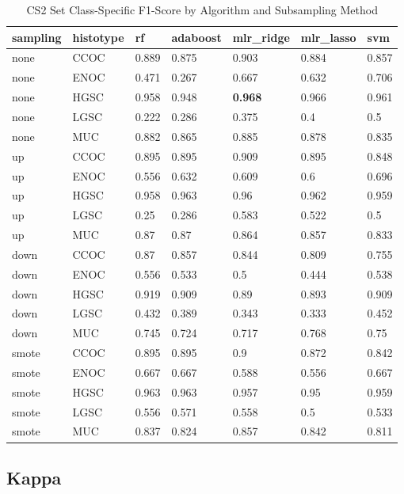 \documentclass[
]{report}
\begin{document}
\begin{table}

\caption{\label{tab:cs2-f1-class-table}CS2 Set Class-Specific F1-Score by Algorithm and Subsampling Method}
\centering
\begin{tabular}[t]{l|l|l|l|l|l|l}
\hline
sampling & histotype & rf & adaboost & mlr\_ridge & mlr\_lasso & svm\\
\hline
none & CCOC & 0.889 & 0.875 & 0.903 & 0.884 & 0.857\\
\hline
none & ENOC & 0.471 & 0.267 & 0.667 & 0.632 & 0.706\\
\hline
none & HGSC & 0.958 & 0.948 & \textbf{0.968} & 0.966 & 0.961\\
\hline
none & LGSC & 0.222 & 0.286 & 0.375 & 0.4 & 0.5\\
\hline
none & MUC & 0.882 & 0.865 & 0.885 & 0.878 & 0.835\\
\hline
up & CCOC & 0.895 & 0.895 & 0.909 & 0.895 & 0.848\\
\hline
up & ENOC & 0.556 & 0.632 & 0.609 & 0.6 & 0.696\\
\hline
up & HGSC & 0.958 & 0.963 & 0.96 & 0.962 & 0.959\\
\hline
up & LGSC & 0.25 & 0.286 & 0.583 & 0.522 & 0.5\\
\hline
up & MUC & 0.87 & 0.87 & 0.864 & 0.857 & 0.833\\
\hline
down & CCOC & 0.87 & 0.857 & 0.844 & 0.809 & 0.755\\
\hline
down & ENOC & 0.556 & 0.533 & 0.5 & 0.444 & 0.538\\
\hline
down & HGSC & 0.919 & 0.909 & 0.89 & 0.893 & 0.909\\
\hline
down & LGSC & 0.432 & 0.389 & 0.343 & 0.333 & 0.452\\
\hline
down & MUC & 0.745 & 0.724 & 0.717 & 0.768 & 0.75\\
\hline
smote & CCOC & 0.895 & 0.895 & 0.9 & 0.872 & 0.842\\
\hline
smote & ENOC & 0.667 & 0.667 & 0.588 & 0.556 & 0.667\\
\hline
smote & HGSC & 0.963 & 0.963 & 0.957 & 0.95 & 0.959\\
\hline
smote & LGSC & 0.556 & 0.571 & 0.558 & 0.5 & 0.533\\
\hline
smote & MUC & 0.837 & 0.824 & 0.857 & 0.842 & 0.811\\
\hline
\end{tabular}
\end{table}

\hypertarget{kappa-2}{%
\subsection{Kappa}\label{kappa-2}}
\end{document}
